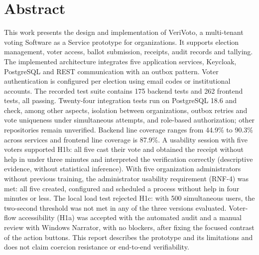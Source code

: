 \section*{Abstract}
This work presents the design and implementation of VeriVoto, a multi-tenant
voting Software as a Service prototype for organizations. It supports election
management, voter access, ballot submission, receipts, audit records and
tallying. The implemented architecture integrates five application services,
Keycloak, PostgreSQL and REST communication with an outbox pattern. Voter
authentication is configured per election using email codes or institutional
accounts. The recorded test suite contains 175 backend tests and 262 frontend
tests, all passing. Twenty-four integration tests run on PostgreSQL 18.6 and
check, among other aspects, isolation between organizations, outbox retries
and vote uniqueness under simultaneous attempts, and role-based
authorization; other repositories remain unverified. Backend line coverage
ranges from 44.9\% to 90.3\% across services and frontend line coverage is
87.9\%. A usability session with five voters
supported H1b: all five cast their vote and obtained the receipt without help in
under three minutes and interpreted the verification correctly (descriptive
evidence, without statistical inference). With five organization
administrators without previous training, the administrator usability
requirement (RNF-4) was met: all five created, configured and scheduled a
process without help in four minutes or less. The local load test rejected H1c: with
500 simultaneous users, the two-second threshold was not met in any of the
three versions evaluated. Voter-flow accessibility (H1a) was accepted with the
automated audit and a manual review with Windows Narrator, with no blockers,
after fixing the focused contrast of the action buttons. This report
describes the prototype and its limitations and does not claim coercion
resistance or end-to-end verifiability.
